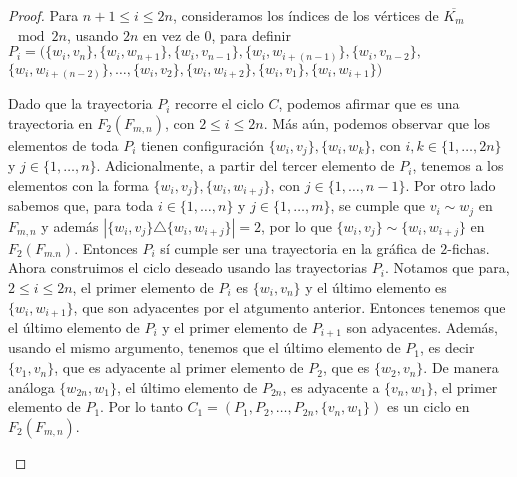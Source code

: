 \begin{proof}
    Para $n+1\leq i \leq 2n$, consideramos los \'indices de los v\'ertices de
    $\overline{K_m}$ $\mod 2n$, usando $2n$ en vez de $0$, para definir
    $P_i=(\{w_i,v_n\},\{w_i,w_{n+1}\},\{w_i,v_{n-1}\},\{w_i,w_{i+(n-1)}\},\{w_i,v_{n-2}\},$
    $\{w_i,w_{i+(n-2)}\},\dots,
    \{w_i,v_2\},\{w_i,w_{i+2}\},\{w_i,v_1\},\{w_i,w_{i+1}\})$

    Dado que la trayectoria $P_i$ recorre el ciclo $C$, podemos afirmar que es
    una trayectoria en $F_2(F_{m,n})$, con $2\leq i \leq 2n$. M\'as a\'un,
    podemos observar que los elementos de toda $P_i$ tienen configuraci\'on
    $\{w_i,v_j\},\{w_i,w_k\}$, con $i, k\in \{1, \dots, 2n\}$ y $j \in \{1,
    \dots, n\}$. Adicionalmente, a partir del tercer elemento de $P_i$, tenemos a
    los elementos con la forma $\{w_i,v_j\},\{w_i,w_{i+j}\}$, con $j \in \{1,
    \dots, n-1\}$.  Por otro lado sabemos que, para toda $i \in \{1, \dots, n\}$
    y $j \in \{1, \dots, m\}$, se cumple que $v_i \sim w_j$ en $F_{m,n}$ y
    adem\'as $|\{w_i,v_j\} \triangle \{w_i, w_{i+j}\}|=2$, por lo que
    $\{w_i,v_j\} \sim \{w_i, w_{i+j}\}$ en $F_2(F_{m.n})$. Entonces $P_i$ s\'i
    cumple ser una trayectoria en la gr\'afica de $2$-fichas. Ahora construimos
    el ciclo deseado usando las trayectorias $P_i$. Notamos que para, $2 \leq i
    \leq 2n$, el primer elemento de $P_i$ es $\{w_i, v_n\}$ y el \'ultimo
    elemento es $\{w_i, w_{i+1}\}$, que son adyacentes por el atgumento
    anterior. Entonces tenemos que el \'ultimo elemento de $P_i$ y el primer
    elemento de $P_{i+1}$ son adyacentes. Adem\'as, usando el mismo argumento,
    tenemos que el \'ultimo elemento de $P_1$, es decir $\{v_1,v_n\}$, que es
    adyacente al primer elemento de $P_2$, que es $\{w_2,v_n\}$. De manera
    an\'aloga $\{w_{2n},w_1\}$, el \'ultimo elemento de $P_{2n}$, es adyacente a
    $\{v_n,w_1\}$, el primer elemento de $P_1$. Por lo tanto $C_1 = (P_1,P_2,
    \dots, P_{2n},\{v_n,w_1\})$ es un ciclo en $F_2(F_{m,n})$. 
  
    \begin{figure}[ht!]
        \centering
\end{figure}
\end{proof}
